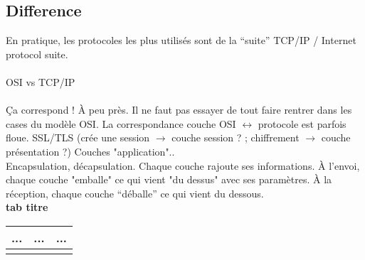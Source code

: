 \documentclass[5pt]{article}
\begin{document}
\begin{scriptsize}
\subsection{Difference }
En pratique, les protocoles les plus utilisés sont de la “suite” TCP/IP / Internet protocol suite.\\
\\OSI vs TCP/IP\\
\\
Ça correspond ! À peu près. Il ne faut pas essayer de tout faire rentrer dans les cases du modèle OSI. La correspondance couche OSI $\leftrightarrow$ protocole est parfois floue. SSL/TLS (crée une session $\longrightarrow$ couche session ? ; chiffrement $\longrightarrow$ couche présentation ?) Couches "application"..\\
Encapsulation, décapsulation. Chaque couche rajoute ses informations. À l’envoi, chaque couche "emballe" ce qui vient "du dessus" avec ses paramètres. À la réception, chaque couche “déballe” ce qui vient du dessous.\\
\textbf{tab titre}  \\
\noindent
\begin{tabularx}{\linewidth}{|Y|Y|Y|}
\hline
... & ... & ...\\ \hline
\\ \hline
\end{tabularx} 
\end{scriptsize}
\end{document}
